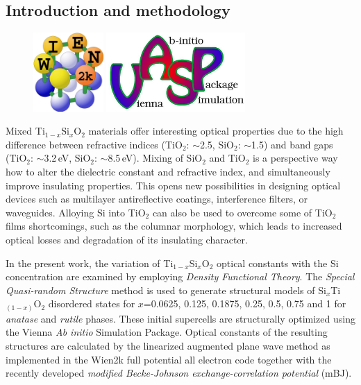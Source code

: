 \documentclass[blues]{poster}
\begin{document}
\begin{multicols}{2}

\subsection{Introduction and methodology }

\begin{figure}
  \vspace{-20pt}
  \begin{center}
    \includegraphics[height=3cm]{WIEN2k-logo.jpg}
    \includegraphics[height=3cm]{VASP-logo.jpg}
  \end{center}
  \vspace{-20pt}
\end{figure}

Mixed Ti$_{1-x}$Si$_x$O$_2$ materials offer interesting optical properties due to the high difference between refractive indices (TiO$_2$: $\sim$2.5, SiO$_2$: $\sim$1.5) and band gaps (TiO$_2$: $\sim$3.2\,eV, SiO$_2$: $\sim$8.5\,eV). Mixing of SiO$_2$ and TiO$_2$ is a perspective way how to alter the dielectric constant and refractive index, and simultaneously improve insulating properties. This opens new possibilities in designing optical devices such as multilayer antireflective coatings, interference filters, or waveguides. Alloying Si into TiO$_2$ can also be used to overcome some of TiO$_2$ films shortcomings, such as the columnar morphology, which leads to increased optical losses and degradation of its insulating character.

In the present work, the variation of Ti$_{1-x}$Si$_x$O$_2$ optical constants with the Si concentration are examined by employing \emph{Density Functional Theory}. 
The \emph{Special Quasi-random Structure} method is used to generate structural models of Si$_x$Ti$_{(1-x)}$O$_2$ disordered states for $x$=0.0625, 0.125, 0.1875, 0.25, 0.5, 0.75 and 1 for \emph{anatase} and \emph{rutile} phases. These initial supercells are structurally optimized using the Vienna \textit{Ab initio} Simulation Package. 
Optical constants of the resulting structures are calculated by the linearized augmented plane wave method as implemented in the Wien2k full potential all electron code together with the recently developed \emph{modified Becke-Johnson exchange-correlation potential} (mBJ).


\end{multicols}
\end{document}
